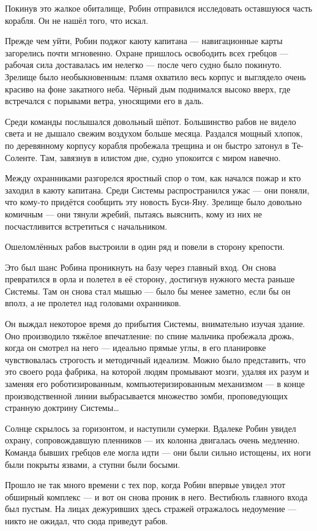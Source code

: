 \documentclass[a5paper, 9pt,
final, openany, twoside=true]{memoir}
\begin{document}
Покинув это жалкое обиталище, Робин отправился исследовать оставшуюся часть корабля. Он не нашёл того, что искал.

Прежде чем уйти, Робин поджог каюту капитана — навигационные карты загорелись почти мгновенно. Охране пришлось освободить всех гребцов — рабочая сила доставалась им нелегко — после чего судно было покинуто. Зрелище было необыкновенным: пламя охватило весь корпус и выглядело очень красиво на фоне закатного неба. Чёрный дым поднимался высоко вверх, где встречался с порывами ветра, уносящими его в даль.

Среди команды послышался довольный шёпот. Большинство рабов не видело света и не дышало свежим воздухом больше месяца. Раздался мощный хлопок, по деревянному корпусу корабля пробежала трещина и он быстро затонул в Те-Соленте. Там, завязнув в илистом дне, судно упокоится с миром навечно.

Между охранниками разгорелся яростный спор о том, как начался пожар и кто заходил в каюту капитана. Среди Системы распространился ужас — они поняли, что кому-то придётся сообщить эту новость Буси-Яну. Зрелище было довольно комичным — они тянули жребий, пытаясь выяснить, кому из них не посчастливится встретиться с начальником.

Ошеломлённых рабов выстроили в один ряд и повели в сторону крепости.

Это был шанс Робина проникнуть на базу через главный вход. Он снова превратился в орла и полетел в её сторону, достигнув нужного места раньше Системы. Там он снова стал мышью — было бы менее заметно, если бы он вполз, а не пролетел над головами охранников.

Он выждал некоторое время до прибытия Системы, внимательно изучая здание. Оно производило тяжёлое впечатление: по спине мальчика пробежала дрожь, когда он смотрел на него — идеально прямые углы, в его планировке чувствовалась строгость и методичный идеализм. Можно было представить, что это своего рода фабрика, на которой людям промывают мозги, удаляя их разум и заменяя его роботизированным, компьютеризированным механизмом — в конце производственной линии выбрасывается множество зомби, проповедующих странную доктрину Системы…\bigskip

Солнце скрылось за горизонтом, и наступили сумерки. Вдалеке Робин увидел охрану, сопровождавшую пленников — их колонна двигалась очень медленно. Команда бывших гребцов еле могла идти — они были сильно истощены, их ноги были покрыты язвами, а ступни были босыми.\bigskip

Прошло не так много времени с тех пор, когда Робин впервые увидел этот обширный комплекс — и вот он снова проник в него. Вестибюль главного входа был пустым. На лицах дежуривших здесь стражей отражалось недоумение — никто не ожидал, что сюда приведут рабов.
\end{document}
